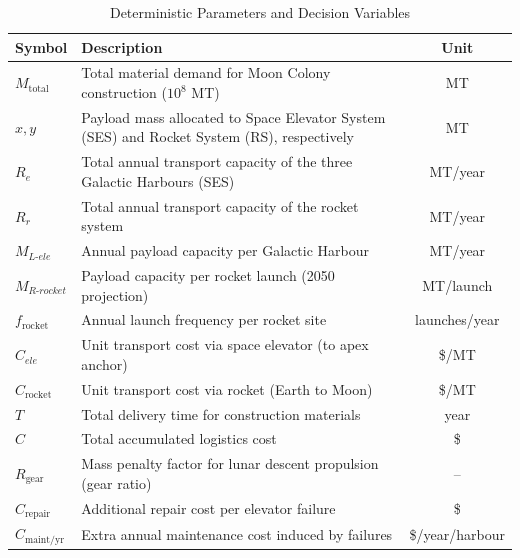 \documentclass{mcmthesis}
\begin{document}
	\begin{table}[htbp]
		\centering
		\caption{Deterministic Parameters and Decision Variables}
		\label{tab:deterministic}
		\begin{tabular}{l p{9cm} c} 
			\toprule
			\textbf{Symbol} & \textbf{Description} & \textbf{Unit} \\
			\midrule
			$M_{\text{total}}$      & Total material demand for Moon Colony construction ($10^8$ MT) & MT \\
			$x, y$                  & Payload mass allocated to Space Elevator System (SES) and Rocket System (RS), respectively & MT \\
			$R_e$                   & Total annual transport capacity of the three Galactic Harbours (SES) & MT/year \\
			$R_r$                   & Total annual transport capacity of the rocket system & MT/year \\
			$M_{L\text{-}ele}$      & Annual payload capacity per Galactic Harbour & MT/year \\
			$M_{R\text{-}rocket}$   & Payload capacity per rocket launch (2050 projection) & MT/launch \\
			$f_{\text{rocket}}$     & Annual launch frequency per rocket site & launches/year \\
			$C_{ele}$               & Unit transport cost via space elevator (to apex anchor) & \$/MT \\
			$C_{\text{rocket}}$     & Unit transport cost via rocket (Earth to Moon) & \$/MT \\
			$T$                     & Total delivery time for construction materials & year \\
			$C$                     & Total accumulated logistics cost & \$ \\
			$R_{\text{gear}}$       & Mass penalty factor for lunar descent propulsion (gear ratio) & -- \\
			$C_{\text{repair}}$     & Additional repair cost per elevator failure & \$ \\
			$C_{\text{maint/yr}}$   & Extra annual maintenance cost induced by failures & \$/year/harbour \\
			\bottomrule
		\end{tabular}
	\end{table}
	
\end{document}
